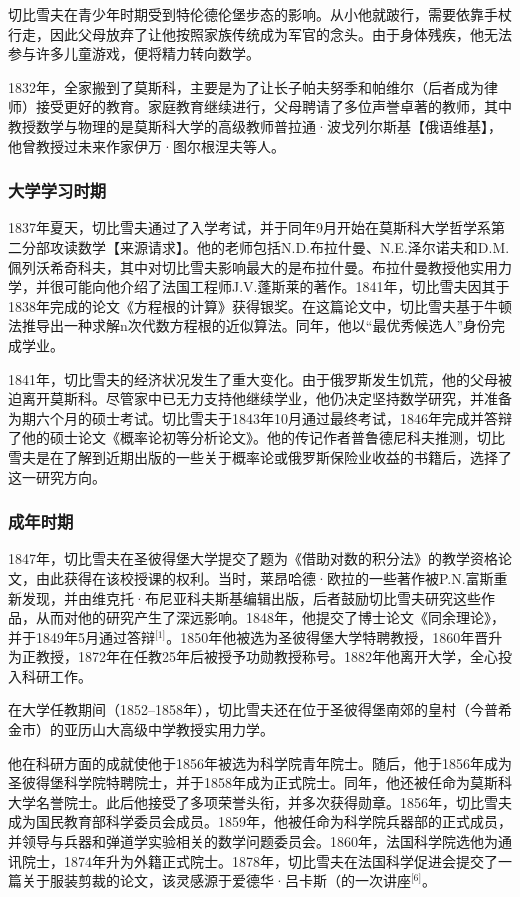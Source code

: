 切比雪夫在青少年时期受到特伦德伦堡步态的影响。从小他就跛行，需要依靠手杖行走，因此父母放弃了让他按照家族传统成为军官的念头。由于身体残疾，他无法参与许多儿童游戏，便将精力转向数学。

1832年，全家搬到了莫斯科，主要是为了让长子帕夫努季和帕维尔（后者成为律师）接受更好的教育。家庭教育继续进行，父母聘请了多位声誉卓著的教师，其中教授数学与物理的是莫斯科大学的高级教师普拉通·波戈列尔斯基【俄语维基】，他曾教授过未来作家伊万·图尔根涅夫等人。
\subsubsection{大学学习时期}
1837年夏天，切比雪夫通过了入学考试，并于同年9月开始在莫斯科大学哲学系第二分部攻读数学【来源请求】。他的老师包括N.D.布拉什曼、N.E.泽尔诺夫和D.M.佩列沃希奇科夫，其中对切比雪夫影响最大的是布拉什曼。布拉什曼教授他实用力学，并很可能向他介绍了法国工程师J.V.蓬斯莱的著作。1841年，切比雪夫因其于1838年完成的论文《方程根的计算》获得银奖。在这篇论文中，切比雪夫基于牛顿法推导出一种求解n次代数方程根的近似算法。同年，他以“最优秀候选人”身份完成学业。

1841年，切比雪夫的经济状况发生了重大变化。由于俄罗斯发生饥荒，他的父母被迫离开莫斯科。尽管家中已无力支持他继续学业，他仍决定坚持数学研究，并准备为期六个月的硕士考试。切比雪夫于1843年10月通过最终考试，1846年完成并答辩了他的硕士论文《概率论初等分析论文》。他的传记作者普鲁德尼科夫推测，切比雪夫是在了解到近期出版的一些关于概率论或俄罗斯保险业收益的书籍后，选择了这一研究方向。
\subsubsection{成年时期}
1847年，切比雪夫在圣彼得堡大学提交了题为《借助对数的积分法》的教学资格论文，由此获得在该校授课的权利。当时，莱昂哈德·欧拉的一些著作被P.N.富斯重新发现，并由维克托·布尼亚科夫斯基编辑出版，后者鼓励切比雪夫研究这些作品，从而对他的研究产生了深远影响。1848年，他提交了博士论文《同余理论》，并于1849年5月通过答辩\(^\text{[1]}\)。1850年他被选为圣彼得堡大学特聘教授，1860年晋升为正教授，1872年在任教25年后被授予功勋教授称号。1882年他离开大学，全心投入科研工作。

在大学任教期间（1852–1858年），切比雪夫还在位于圣彼得堡南郊的皇村（今普希金市）的亚历山大高级中学教授实用力学。

他在科研方面的成就使他于1856年被选为科学院青年院士。随后，他于1856年成为圣彼得堡科学院特聘院士，并于1858年成为正式院士。同年，他还被任命为莫斯科大学名誉院士。此后他接受了多项荣誉头衔，并多次获得勋章。1856年，切比雪夫成为国民教育部科学委员会成员。1859年，他被任命为科学院兵器部的正式成员，并领导与兵器和弹道学实验相关的数学问题委员会。1860年，法国科学院选他为通讯院士，1874年升为外籍正式院士。1878年，切比雪夫在法国科学促进会提交了一篇关于服装剪裁的论文，该灵感源于爱德华·吕卡斯（的一次讲座\(^\text{[6]}\)。

